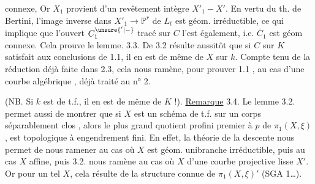 connexe,  Or $X_1$ provient d'un revêtement   intègre   $X'_1-X'$. En vertu du th. de Bertini, l'image inverse  dans $X'_1\longrightarrow\mathbb P^r$  de $L_t$ est  géom. irréductible, ce qui implique que l'ouvert $C_1^{\unsure{'|-}}$ tracé sur $C$ l'est également, i.e. $\bar C_1$ est géom connexe. Cela prouve le lemme.
3.3. De 3.2 résulte aussitôt que si  $C$ sur $K$ satisfait aux conclusions de 1.1, il en est de même de $X$ sur $k$. Compte tenu de la réduction déjà faite dans 2.3, cela nous ramène, pour prouver 1.1 , au cas d'une courbe algébrique , déjà traité au n° 2.

(NB. Si $k$ est de t.f., il en est de même de $K$ !).
\uline{Remarque} 3.4. Le lemme 3.2. permet aussi de montrer que si $X$ est un schéma de t.f. sur un corps séparablement clos , alors le  plus grand  quotient profini premier à $p$ de $\pi_1(X,\xi)$,  est topologique à engendrement fini. En effet, la théorie de la descente  nous permet de nous ramener au cas où $X$ est géom. unibranche irréductible,  puis au cas  $X$ affine, puis 3.2. nous ramène au cas où $X$   d'une courbe projective lisse $X'$. Or pour un tel $X$, cela résulte de la structure connue de $\pi_1(X,\xi)'$ (SGA 1\ldots).
